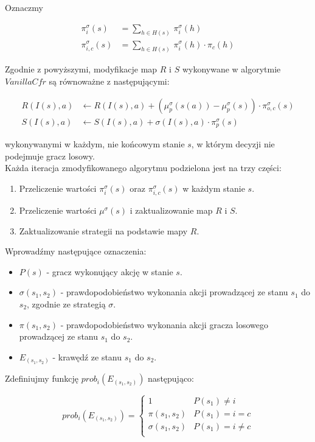 \documentclass[licencjacka]{pracamgr}
\begin{document}
\noindent
Oznaczmy

\begin{align*}
\pi_i^{\sigma}(s) &= \sum\limits_{h \in H(s)} \, \pi_i^{\sigma}(h) \\
\pi_{i,c}^{\sigma}(s) &= \sum\limits_{h \in H(s)} \, \pi_i^{\sigma}(h) \cdot \pi_c(h)
\end{align*}

\noindent
Zgodnie z powyższymi, modyfikacje map $R$ i $S$ wykonywane w algorytmie $VanillaCfr$ są
równoważne z następującymi:

\begin{align*}
R(I(s), a) &\leftarrow R(I(s), a) + (\mu_p^{\sigma}(s(a)) - \mu_p^{\sigma}(s)) \cdot \pi_{o,c}^{\sigma}(s) \\
S(I(s), a) &\leftarrow S(I(s), a) + \sigma(I(s), a) \cdot \pi_p^{\sigma}(s)
\end{align*}

\noindent
wykonywanymi w każdym, nie końcowym stanie $s$, w którym decyzji nie podejmuje gracz losowy. \\

\noindent
Każda iteracja zmodyfikowanego algorytmu podzielona jest na trzy części:
\begin{enumerate}
\item Przeliczenie wartości $\pi_i^{\sigma}(s)$ oraz $\pi_{i, c}^{\sigma}(s)$ w każdym stanie $s$.
\item Przeliczenie wartości $\mu^{\sigma}(s)$ i zaktualizowanie map $R$ i $S$.
\item Zaktualizowanie strategii na podstawie mapy $R$.
\end{enumerate}

\noindent
Wprowadźmy następujące oznaczenia:

\begin{itemize}
\item $P(s)$ - gracz wykonujący akcję w stanie $s$.
\item $\sigma(s_1, s_2)$ - prawdopodobieństwo wykonania akcji prowadzącej ze stanu $s_1$ do $s_2$, zgodnie ze strategią $\sigma$.
\item $\pi(s_1, s_2)$ - prawdopodobieństwo wykonania akcji gracza losowego prowadzącej ze stanu $s_1$ do $s_2$.
\item $E_{(s_1, s_2)}$ - krawędź ze stanu $s_1$ do $s_2$.
\end{itemize}

\noindent
Zdefiniujmy funkcję $prob_i(E_{(s_1, s_2)})$ następująco:

\begin{equation*}
prob_i(E_{(s_1, s_2)}) = \begin{cases}
                            1                & P(s_1) \neq i     \\
                            \pi(s_1, s_2)    & P(s_1) = i = c    \\
                            \sigma(s_1, s_2) & P(s_1) = i \neq c \\
                          \end{cases}
\end{equation*}
\end{document}
